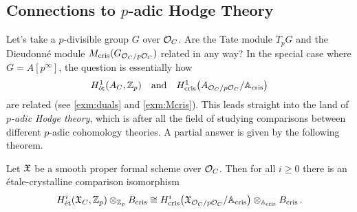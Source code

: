 \documentclass[a4paper, 10pt, oneside, DIV=9, chapterprefix=true, numbers=enddot,bibliography=totoc]{scrbook}
\begin{document}
\subsection{Connections to \texorpdfstring{$p$}{p}-adic Hodge Theory}
\begin{qst}
	Let's take a $p$-divisible group $G$ over $\mathcal{O}_C$. Are the Tate module $T_pG$ and the Dieudonné module $M_{\mathrm{cris}}(G_{\mathcal{O}_C/p\mathcal{O}_C})$ related in any way? In the special case where $G=A[p^\infty]$, the question is essentially how
	\begin{equation*}
	H_{\mathrm{\acute{e}t}}^1(A_C,\mathbb{Z}_p)\quad\text{and}\quad H_{\mathrm{cris}}^1\big(A_{\mathcal{O}_C/p\mathcal{O}_C}/\mathbb{A}_{\mathrm{cris}}\big)
	\end{equation*}
	are related (see \cref{exm:duals} and \cref{exm:Mcris}). This leads straight into the land of \emph{$p$-adic Hodge theory}, which is after all the field of studying  comparisons between different $p$-adic cohomology theories. A partial answer is given by the following theorem.
\end{qst}
\begin{thm}\label{thm:BMS}
	Let $\mathfrak{X}$ be a smooth proper formal scheme over $\mathcal{O}_C$. Then for all $i\geq 0$ there is an étale-crystalline comparison isomorphism
	\begin{equation*}
		H_{\mathrm{\acute{e}t}}^i(\mathfrak{X}_C,\mathbb{Z}_p)\otimes_{\mathbb{Z}_p}B_{\mathrm{cris}}\cong H_{\mathrm{cris}}^i\big(\mathfrak{X}_{\mathcal{O}_C/p\mathcal{O}_C}/\mathbb{A}_{\mathrm{cris}}\big)\otimes_{\mathbb{A}_{\mathrm{cris}}}B_{\mathrm{cris}}\,.
	\end{equation*}
\end{thm}
\end{document}
